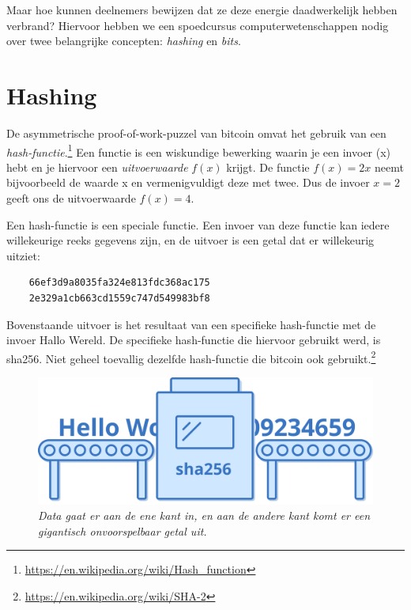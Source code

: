 Maar hoe kunnen deelnemers bewijzen dat ze deze energie daadwerkelijk hebben verbrand? Hiervoor hebben we een spoedcursus computerwetenschappen nodig over twee belangrijke concepten: \textit{hashing} en \textit{bits}.

\section{Hashing}

De asymmetrische proof-of-work-puzzel van bitcoin omvat het gebruik van een \textit{hash-functie}.\footnote{\href{https://en.wikipedia.org/wiki/Hash\_function}{https://en.wikipedia.org/wiki/Hash\_function}} Een functie is een wiskundige bewerking waarin je een invoer (x) hebt en je hiervoor een \textit{uitvoerwaarde} $f(x)$ krijgt. De functie $f(x)=2x$ neemt bijvoorbeeld de waarde x en vermenigvuldigt deze met twee. Dus de invoer $x=2$ geeft ons de uitvoerwaarde $f(x)=4$.

Een hash-functie is een speciale functie. Een invoer van deze functie kan iedere willekeurige reeks gegevens zijn, en de uitvoer is een getal dat er willekeurig uitziet:

\begin{verbatim}
    66ef3d9a8035fa324e813fdc368ac175
    2e329a1cb663cd1559c747d549983bf8
\end{verbatim}

Bovenstaande uitvoer is het resultaat van een specifieke hash-functie met de invoer \textquotedbl{}Hallo Wereld\textquotedbl{}. De specifieke hash-functie die hiervoor gebruikt werd, is sha256. Niet geheel toevallig dezelfde hash-functie die bitcoin ook gebruikt.\footnote{\href{https://en.wikipedia.org/wiki/SHA-2}{https://en.wikipedia.org/wiki/SHA-2}}

\begin{figure}
    \centering
    \includegraphics[width=\textwidth]{images/fig4.png}
    \caption{\footnotesize{\textit{Data gaat er aan de ene kant in, en aan de andere kant komt er een gigantisch onvoorspelbaar getal uit.}}}
    \label{fig4}
\end{figure}

